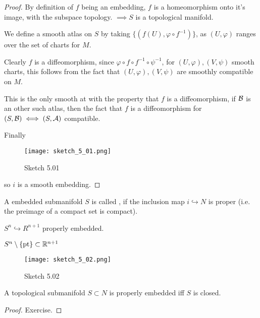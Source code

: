 \begin{proof}
    By definition of \(f\) being an embedding, \(f\) is a homeomorphism onto it's image, with the subspace topology.
    \(\implies S\) is a topological manifold. 

    We define a smooth atlas on \(S\) by taking \(\{(f(U),\varphi\circ f^{-1})\}\), as \((U,\varphi)\) ranges over the set of charts 
    for \(M\).

    Clearly \(f\) is a diffeomorphism, since \(\varphi\circ f\circ f^{-1}\circ\psi^{-1}\), for \((U,\varphi),(V,\psi)\) smooth charts, this follows 
    from the fact that \((U,\varphi),(V,\psi)\) are smoothly compatible on \(M\).

    This is the only smooth at with the property that \(f\) is a diffeomorphism, if \(\mathcal{B}\) is an other such atlas, then the fact 
    that \(f\) is a diffeomorphism for \((S,\mathcal{B})\iff (S,\mathcal{A})\) compatible.

    Finally
    \begin{figure}[H]
        \centering
        \texttt{[image: sketch\_5\_01.png]}
        \caption{Sketch 5.01}
    \end{figure}
    so \(i\) is a smooth embedding.
\end{proof} 

\begin{definition*}
    A embedded submanifold \(S\) is called , if the inclusion map 
    \(i\hookrightarrow N\) is proper (i.e. the preimage of a compact set is compact). 
\end{definition*}

\begin{example}
    \(S^n\hookrightarrow R^{n+1}\) properly embedded. 
\end{example}

\begin{example}
    \(S^n\setminus\{\text{pt}\}\subset\mathbb{R}^{n+1}\)
    \begin{figure}[H]
        \centering
        \texttt{[image: sketch\_5\_02.png]}
        \caption{Sketch 5.02}
    \end{figure}
\end{example}

\begin{lemma}\label{lem:5.2}
    A topological submanifold \(S\subset N\) is properly embedded iff 
    \(S\) is closed.
\end{lemma}

\begin{proof}
    Exercise.
\end{proof}

